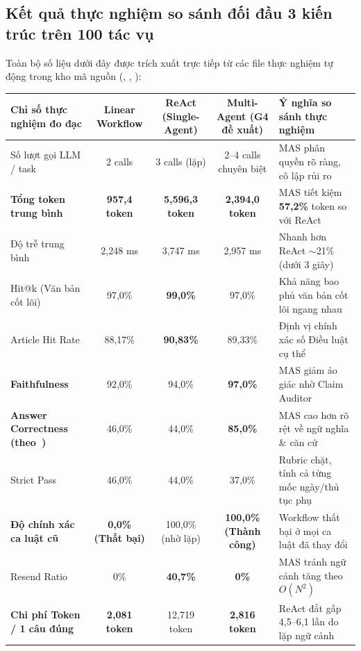 \documentclass[10pt,a4paper]{article}
\begin{document}
\subsection{Kết quả thực nghiệm so sánh đối đầu 3 kiến trúc trên 100 tác vụ}
Toàn bộ số liệu dưới đây được trích xuất trực tiếp từ các file thực nghiệm tự động trong kho mã nguồn (, , ):

\begin{center}
\small
\begin{tabularx}{\linewidth}{@{}p{4.0cm} c c c X@{}}
\toprule
\textbf{Chỉ số thực nghiệm đo đạc} & \textbf{Linear Workflow} & \textbf{ReAct (Single-Agent)} & \textbf{Multi-Agent (G4 đề xuất)} & \textbf{Ý nghĩa so sánh thực nghiệm} \\
\midrule
Số lượt gọi LLM / task & 2 calls & 3 calls (lặp) & 2--4 calls chuyên biệt & MAS phân quyền rõ ràng, cô lập rủi ro \\
\textbf{Tổng token trung bình} & \textbf{957{,}4 token} & \textbf{5{,}596{,}3 token} & \textbf{2{,}394{,}0 token} & MAS tiết kiệm \textbf{57,2\%} token so với ReAct \\
Độ trễ trung bình & 2{,}248 ms & 3{,}747 ms & 2{,}957 ms & Nhanh hơn ReAct $\sim$21\% (dưới 3 giây) \\
Hit@k (Văn bản cốt lõi) & 97{,}0\% & \textbf{99{,}0\%} & 97{,}0\% & Khả năng bao phủ văn bản cốt lõi ngang nhau \\
Article Hit Rate & 88{,}17\% & \textbf{90{,}83\%} & 89{,}33\% & Định vị chính xác số Điều luật cụ thể \\
\textbf{Faithfulness} & 92{,}0\% & 94{,}0\% & \textbf{97{,}0\%} & MAS giảm ảo giác nhờ Claim Auditor \\
\textbf{Answer Correctness (theo~\cite{phan2026sbvlawgraph})} & 46{,}0\% & 44{,}0\% & \textbf{85{,}0\%} & MAS cao hơn rõ rệt về ngữ nghĩa \& căn cứ \\
Strict Pass & 46{,}0\% & 44{,}0\% & 37{,}0\% & Rubric chặt, tính cả từng mốc ngày/thủ tục phụ \\
\textbf{Độ chính xác ca luật cũ} & \textbf{0{,}0\% (Thất bại)} & 100{,}0\% (nhờ lặp) & \textbf{100{,}0\% (Thành công)} & Workflow thất bại ở mọi ca luật đã thay đổi \\
Resend Ratio & 0\% & \textbf{40{,}7\%} & \textbf{0\%} & MAS tránh ngữ cảnh tăng theo $O(N^2)$ \\
\textbf{Chi phí Token / 1 câu đúng} & \textbf{2{,}081 token} & 12{,}719 token & \textbf{2{,}816 token} & ReAct đắt gấp 4,5--6,1 lần do lặp ngữ cảnh \\
\bottomrule
\end{tabularx}
\end{center}
\end{document}
